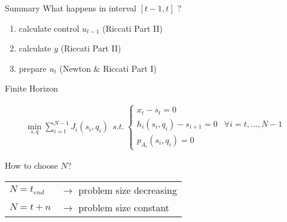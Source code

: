 \begin{frame}{Summary}
What happens in interval $ [ t-1 , t ] $ ?
\begin{figure}
\end{figure}

\begin{enumerate}
\item<2-> {\color{red} calculate control $u_{t-1}$ (Riccati Part II)}
\item<3-> {\color{blue} calculate $y$ (Riccati Part II)}
\item<4-> {\color{green2} prepare $u_t$ (Newton \& Riccati Part I)} 
\end{enumerate}
\end{frame}

\begin{frame}{Finite Horizon}

\begin{block}{}
\small{
\begin{align*}
  \min_{s, q} \sum_{i=t}^{N-1} J_{i}(s_{i},q_{i}) \ \  
  s.t. \ \left\lbrace \begin{array}{rl}
  x_{t} - s_{t} = 0 & \\
  h_i (s_i ,q_i ) - s_{i+1} = 0 & \forall i = t, ... , N-1 \\
  p_{A_i}(s_i, q_i) = 0 & \end{array} \right. 
\end{align*}}
\end{block}
\vspace{1ex}
How to choose $N$? \\
\vspace{1ex}
\begin{tabular}{l l}
$N=t_{end} $ &$ \rightarrow $ problem size decreasing \\ \vspace{1ex}
\onslide<2->
$N=t+n $ & $\rightarrow $ problem size constant \\
\end{tabular}

\end{frame}
%